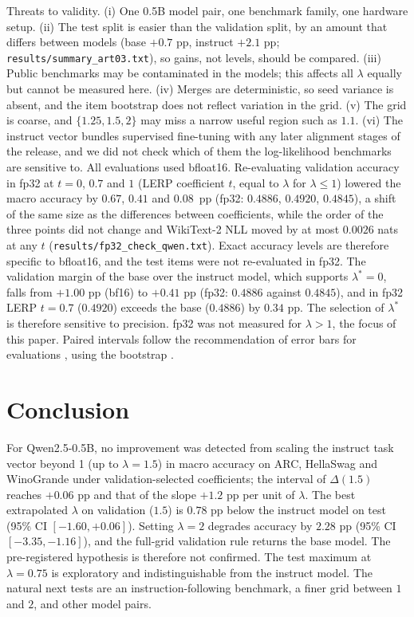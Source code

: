 \documentclass[conference]{IEEEtran}
\begin{document}
Threats to validity. (i) One 0.5B model pair, one benchmark family, one hardware setup. (ii) The test split is easier than the validation split, by an amount that differs between models (base $+0.7$ pp, instruct $+2.1$ pp; \texttt{results/summary\_art03.txt}), so gains, not levels, should be compared. (iii) Public benchmarks may be contaminated in the models; this affects all $\lambda$ equally but cannot be measured here. (iv) Merges are deterministic, so seed variance is absent, and the item bootstrap does not reflect variation in the grid. (v) The grid is coarse, and $\{1.25,1.5,2\}$ may miss a narrow useful region such as $1.1$. (vi) The instruct vector bundles supervised fine-tuning with any later alignment stages of the release, and we did not check which of them the log-likelihood benchmarks are sensitive to. All evaluations used bfloat16. Re-evaluating validation accuracy in fp32 at $t=0$, $0.7$ and $1$ (LERP coefficient $t$, equal to $\lambda$ for $\lambda\le1$) lowered the macro accuracy by $0.67$, $0.41$ and $0.08$~pp (fp32: $0.4886$, $0.4920$, $0.4845$), a shift of the same size as the differences between coefficients, while the order of the three points did not change and WikiText-2 NLL moved by at most $0.0026$ nats at any $t$ (\texttt{results/fp32\_check\_qwen.txt}). Exact accuracy levels are therefore specific to bfloat16, and the test items were not re-evaluated in fp32. The validation margin of the base over the instruct model, which supports $\lambda^\ast=0$, falls from $+1.00$ pp (bf16) to $+0.41$ pp (fp32: $0.4886$ against $0.4845$), and in fp32 LERP $t=0.7$ ($0.4920$) exceeds the base ($0.4886$) by $0.34$ pp. The selection of $\lambda^\ast$ is therefore sensitive to precision. fp32 was not measured for $\lambda>1$, the focus of this paper. Paired intervals follow the recommendation of error bars for evaluations \cite{miller2024errorbars}, using the bootstrap \cite{efron1979bootstrap}.

\section{Conclusion}
For Qwen2.5-0.5B, no improvement was detected from scaling the instruct task vector beyond 1 (up to $\lambda=1.5$) in macro accuracy on ARC, HellaSwag and WinoGrande under validation-selected coefficients; the interval of $\Delta(1.5)$ reaches $+0.06$ pp and that of the slope $+1.2$ pp per unit of $\lambda$. The best extrapolated $\lambda$ on validation ($1.5$) is $0.78$ pp below the instruct model on test (95\% CI $[-1.60,+0.06]$). Setting $\lambda=2$ degrades accuracy by $2.28$ pp (95\% CI $[-3.35,-1.16]$), and the full-grid validation rule returns the base model. The pre-registered hypothesis is therefore not confirmed. The test maximum at $\lambda=0.75$ is exploratory and indistinguishable from the instruct model. The natural next tests are an instruction-following benchmark, a finer grid between $1$ and $2$, and other model pairs.
\end{document}
